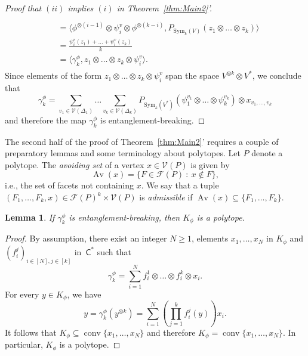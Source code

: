 \documentclass{amsart}
\newcommand{\st}{\ : \ }
\renewcommand{\geq}{\geqslant}
\renewcommand{\subset}{\subseteq}
\newcommand{\gC}{\mathsf{C}}
\DeclareMathOperator{\conv}{\mathrm{conv}}
\newcommand{\Sym}{\mathrm{Sym}}
\DeclareMathOperator{\Av}{Av}
\theoremstyle{plain}
\newtheorem{lemma}[theorem]{Lemma}
\begin{document}
\begin{proof}[Proof that $(ii)$ implies $(i)$ in Theorem~\ref{thm:Main2}']
\begin{align*}
\begin{aligned}
\\ & =  \langle \phi^{\otimes (i-1)}  \otimes \psi_i^v \otimes \phi^{\otimes (k-i)}, P_{\Sym_k(V)} (z_1 \otimes \dots \otimes z_k ) \rangle 
\\ & =  \frac{\psi_i^v(z_1) + \dots + \psi_i^v(z_k)}{k}
\\ & = \langle \gamma_k^\phi, z_1 \otimes \dots \otimes z_k \otimes \psi_i^v \rangle.
\end{aligned}
\end{align*}
Since elements of the form $z_1 \otimes \dots \otimes z_k \otimes \psi_i^v$ span the space $V^{\otimes k} \otimes V^*$, we conclude that
\begin{equation*} %
\gamma_k^\phi = 
\sum_{v_1 \in \mathcal{V}(\Delta_1)} \dots  \sum_{v_k \in \mathcal{V}(\Delta_k)}
 P_{\Sym_k(V^*)} ( \psi_{1}^{v_1} \otimes \dots \otimes \psi_{k}^{v_k} )
\otimes x_{v_1,\dots,v_k}  \end{equation*}
and therefore the map $\gamma_k^\phi$ is entanglement-breaking.
\end{proof}

The second half of the proof of Theorem~\ref{thm:Main2}' requires a couple of preparatory lemmas and some terminology about polytopes. Let $P$ denote a polytope. The \emph{avoiding set} of a vertex $x \in \mathcal{V}(P)$ is given by
\[ 
\Av(x) = \{ F \in \mathcal{F}(P) \st x \not \in F \},
\] 
i.e., the set of facets not containing $x$. We say that a tuple $(F_1,\dots,F_k,x) \in  \mathcal{F}(P)^k \times \mathcal{V}(P)$ is \emph{admissible} if $\Av(x) \subset \{F_1,\dots,F_k\}$. 

\begin{lemma} \label{lemma:gamma-is-polytope}
If $\gamma_k^\phi$ is entanglement-breaking, then $K_\phi$ is a polytope.
\end{lemma}

\begin{proof}
By assumption, there exist an integer $N \geq 1$, elements $x_1,\dots,x_N$ in $K_\phi$ and $(f_i^j)_{i \in [N], j \in [k]}$ in~$\gC^*$ such that
\begin{equation} \label{eq:gamma-decomposition} \gamma_k^\phi = \sum_{i=1}^N f_i^1 \otimes \dots \otimes f_i^k \otimes x_i. \end{equation}
For every $y \in K_\phi$, we have 
\[ y = \gamma_k^\phi \left(y^{\otimes k}\right) = \sum_{i=1}^N \left( \prod_{j=1}^k f_i^j(y) \right) x_i .\]
It follows that $K_\phi \subset \conv \{ x_1,\dots,x_N \}$ and therefore $K_\phi=\conv \{ x_1,\dots,x_N \}$. In particular, $K_\phi$ is a polytope.
\end{proof}
\end{document}
